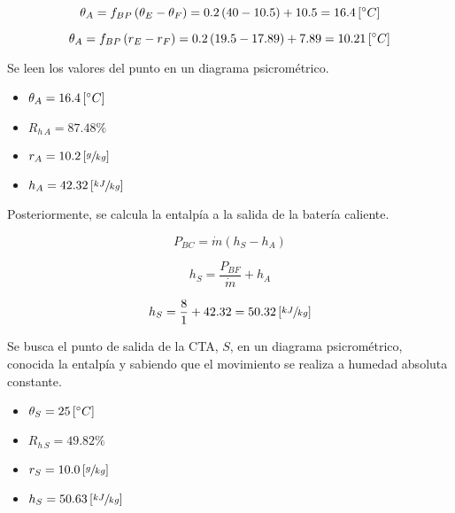 \documentclass[11pt]{article}
\begin{document}
\[ \theta _A = f_{ BP } \left( \theta _E - \theta _F \right) = 0.2 \left( 40 - 10.5 \right) + 10.5 = 16.4 \left[ \degree C \right] \]

\[ \theta _A = f_{ BP } \left( r_E - r_F \right) = 0.2 \left( 19.5 - 17.89 \right) + 7.89 = 10.21 \left[ \degree C \right] \]

Se leen los valores del punto en un diagrama psicrométrico.

\begin{itemize}
    \item
    $ \theta _A = 16.4 \left[ \degree C \right] $

    \item
    $ R_{ h \, A } = 87.48\% $

    \item
    $ r_A = 10.2 \left[ \sfrac{ g }{ kg } \right] $

    \item
    $ h_A = 42.32 \left[ \sfrac{ kJ }{ kg } \right] $

\end{itemize}

Posteriormente, se calcula la entalpía a la salida de la batería caliente.

\[ P_{ BC } = \dot{ m } \left( h_S - h_A \right) \]

\[ h_S = \frac{ P_{ BF } }{ \dot{ m } } + h_A \]

\[ h_S = \frac{ 8 }{ 1 } + 42.32 = 50.32 \left[ \sfrac{ kJ }{ kg } \right] \]

Se busca el punto de salida de la CTA, $ S $, en un diagrama psicrométrico, conocida la entalpía y sabiendo que el movimiento se realiza a humedad absoluta constante.

\begin{itemize}
    \item
    $ \theta _S = 25 \left[ \degree C \right] $

    \item
    $ R_{ h \, S } = 49.82\% $

    \item
    $ r_S = 10.0 \left[ \sfrac{ g }{ kg } \right] $

    \item
    $ h_S = 50.63 \left[ \sfrac{ kJ }{ kg } \right] $

\end{itemize}

\end{document}
